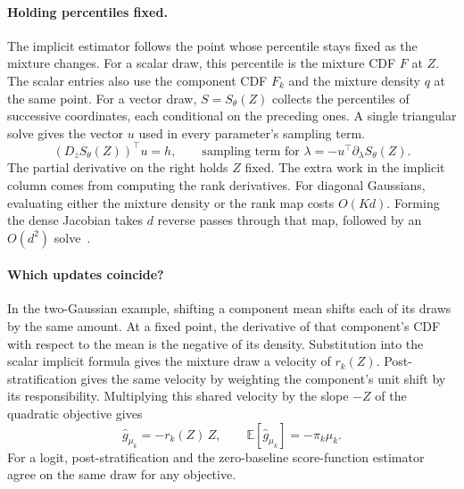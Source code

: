 \paragraph*{Holding percentiles fixed.}
The implicit estimator follows the point whose percentile stays fixed as
the mixture changes. For a scalar draw, this percentile is the mixture CDF
$F$ at $Z$. The scalar entries also use the component CDF $F_k$ and the
mixture density $q$ at the same point. For a vector draw, $S=S_\theta(Z)$
collects the percentiles of successive coordinates, each conditional on the
preceding ones. A single triangular solve gives the vector $u$ used in every
parameter's sampling term.
\begin{equation}
 (D_z S_\theta(Z))^\top u = h,
 \qquad
 \text{sampling term for }\lambda = -u^\top\partial_\lambda S_\theta(Z).
 \label{eq:implicit-adjoint}
\end{equation}
The partial derivative on the right holds $Z$ fixed. The extra work in the
implicit column comes from computing the rank derivatives. For diagonal
Gaussians, evaluating either the mixture density or the rank map costs
$O(Kd)$. Forming the dense Jacobian takes $d$ reverse passes through that
map, followed by an $O(d^2)$ solve~\citep{burroni2026mixture}.

\paragraph*{Which updates coincide?}
In the two-Gaussian example, shifting a component mean shifts each of its
draws by the same amount. At a fixed point, the derivative of that
component's CDF with respect to the mean is the negative of its density.
Substitution into the scalar implicit formula gives the mixture draw a
velocity of $r_k(Z)$. Post-stratification gives the same velocity by
weighting the component's unit shift by its responsibility. Multiplying
this shared velocity by the slope $-Z$ of the quadratic objective gives
\begin{equation*}
 \widehat g_{\mu_k} = -r_k(Z)\,Z,
 \qquad
 \mathbb E[\widehat g_{\mu_k}] = -\pi_k\mu_k .
\end{equation*}
For a logit, post-stratification and the zero-baseline score-function
estimator agree on the same draw for any objective.

